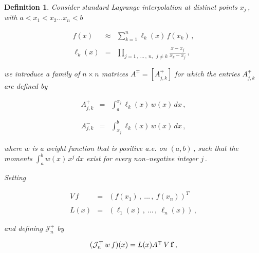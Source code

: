 \documentclass[11pt]{article}
\newtheorem{Definition}[Theorem]{Definition}
\begin{document}
 \vspace{.2in} \noindent \begin{Definition}%
\label{definition:3.1}
   Consider standard Lagrange interpolation at distinct points
 $x_j$\,, with $a < x_1 < x_2 \ldots x_n < b$

 \begin{equation}%
   \begin{array}{rcl}
     f(x) & \approx & \displaystyle \sum_{k=1}^n \ell_k(x) \, f(x_k)\,, \\
     && \\
     \ell_k(x) & = & \displaystyle \prod_{j = 1\,,\ \ldots\,,\ n,\ \ j \neq
       k}\frac{x - x_j}{x_k - x_j}\,,
   \end{array}
   \label{equation:3.1}
\end{equation}

 \noindent we introduce a family of $n \times n$ matrices $A^\mp =
 \left[A_{j,k}^\mp\right]$ for which the
 entries $A_{j,k}^\mp$ are defined by

\begin{equation} %
\begin{array}{rcl}
A_{j,k}^+ & = & \displaystyle \int_a^{x_j} \ell_k(x) \, w(x) \, dx\,, \\
\\
&& \\
A_{j,k}^- & = & \displaystyle \int_{x_j}^b \ell_k(x) \, w(x) \, dx\,,
\end{array}
\label{equation:3.2}
\end{equation}

\noindent where $w$ is a weight function that is positive a.e. on
$(a,b)$\,, such that the moments $\int_a^b w(x)\,x^j\,dx$ exist for
every non--negative integer $j$\,.

\vspace{.1in} \noindent Setting

\begin{equation}%
  \begin{array}{rcl}
    V\,f & = & (f(x_1)\,,\ \ldots\,,\ f(x_n))^T \\
    && \\
    L(x) & = & (\ell_1(x)\,,\ \ldots\,,\ \ell_n(x))\,,
  \end{array}
  \label{equation:3.3}
\end{equation}

\noindent and defining ${\mathcal J}^\mp_n$ by
  
\begin{equation}%
  ({\mathcal J}^\mp_n\,w\,f)(x) = L(x) A^\mp\,V\,{\bf f}\,,
  \label{equation:3.4}
\end{equation}


\end{Definition}
\end{document}
